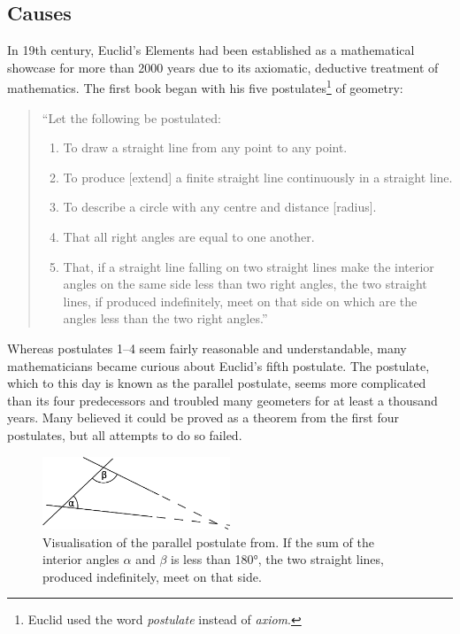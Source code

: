 \documentclass[hidelinks]{article}
\begin{document}
\subsection{Causes}\label{ssec_causes}
In 19th century, Euclid's Elements had been established as a mathematical showcase for more than 2000 years due to its axiomatic, deductive treatment of mathematics. The first book began with his five postulates\footnote{Euclid used the word \textit{postulate} instead of \textit{axiom}.} of geometry:
\begin{quote}
``Let the following be postulated:
\begin{enumerate}
\item To draw a straight line from any point to any point.
\item To produce [extend] a finite straight line continuously in a straight line.
\item To describe a circle with any centre and distance [radius].
\item That all right angles are equal to one another.
\item That, if a straight line falling on two straight lines make the interior angles on the same side less than two right angles, the two straight lines, if produced indefinitely, meet on that side on which are the angles less than the two right angles.''
\end{enumerate}
\end{quote}
Whereas postulates 1--4 seem fairly reasonable and understandable, many mathematicians became curious about Euclid's fifth postulate. The postulate, which to this day is known as the parallel postulate, seems more complicated than its four predecessors and troubled many geometers for at least a thousand years. Many believed it could be proved as a theorem from the first four postulates, but all attempts to do so failed. 

\begin{figure}[h]
	\centering
	\includegraphics[width=0.5\textwidth]{img/parallel_postulate.png}
	\caption{Visualisation of the parallel postulate from\cite[Wikipedia]{wiki_parallel_postulate}. If the sum of the interior angles $\alpha$ and $\beta$ is less than 180°, the two straight lines, produced indefinitely, meet on that side.}
\end{figure}
\end{document}
